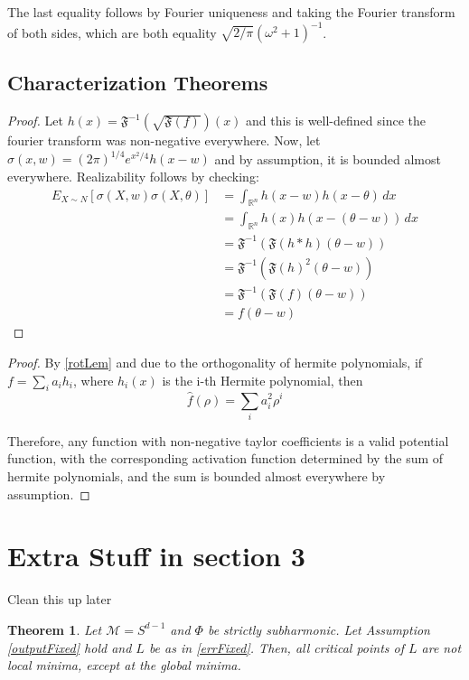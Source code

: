 \documentclass{article}
\newtheorem{theorem}{Theorem}[section]
\newcommand{\R}{{\mathbb{R}}}
\newcommand{\todo}[1]{\colorbox{Mygray}{\color{red}#1}}
\newcommand{\todo}[1]{#1}
\begin{document}
The last equality follows by Fourier uniqueness and taking the Fourier transform of both sides, which are both equality $\sqrt{2/\pi}(\omega^2+1)^{-1}$. 



\subsection{Characterization Theorems}

\tranReal*

\begin{proof}
Let $h(x) = \mathfrak{F}^{-1}(\sqrt{\mathfrak{F}(f)})(x)$ and this is well-defined since the fourier transform was non-negative everywhere. Now, let $\sigma(x,w) = (2\pi)^{1/4}e^{x^2/4}h(x-w)$ and by assumption, it is bounded almost everywhere. Realizability follows by checking:
%
\begin{align*}
    E_{X \sim N}[\sigma(X,w)\sigma(X,\theta)]  &= \int_{\R^n} h(x-w)h(x-\theta) \, dx \\
    &= \int_{\R^n} h(x)h(x-(\theta-w)) \, dx \\
    &= \mathfrak{F}^{-1}(\mathfrak{F}(h\ast h)(\theta -w)) \\
    &= \mathfrak{F}^{-1}(\mathfrak{F}(h)^2(\theta - w)) \\
    &= \mathfrak{F}^{-1}(\mathfrak{F}(f)(\theta - w)) \\
    &= f(\theta - w) 
\end{align*}
\end{proof}




\rotReal*

\begin{proof}
By \ref{rotLem} and due to the orthogonality of hermite polynomials, if $f = \sum_i a_i h_i$, where $h_i(x)$ is the i-th Hermite polynomial, then
%
\[\widehat{f}(\rho) = \sum_{i} a_i^2 \rho^i\]

Therefore, any function with non-negative taylor coefficients is a valid potential function, with the corresponding activation function determined by the sum of hermite polynomials, and the sum is bounded almost everywhere by assumption.
\end{proof}

\section{Extra Stuff in section 3}
\todo{Clean this up later}

\begin{theorem}
Let $\mathcal{M} = S^{d-1}$ and $\Phi$ be strictly subharmonic. Let Assumption \ref{outputFixed} hold and $L$ be as in \eqref{errFixed}. Then, all critical points of $L$ are not local minima, except at the global minima. 
\end{theorem}
\end{document}
